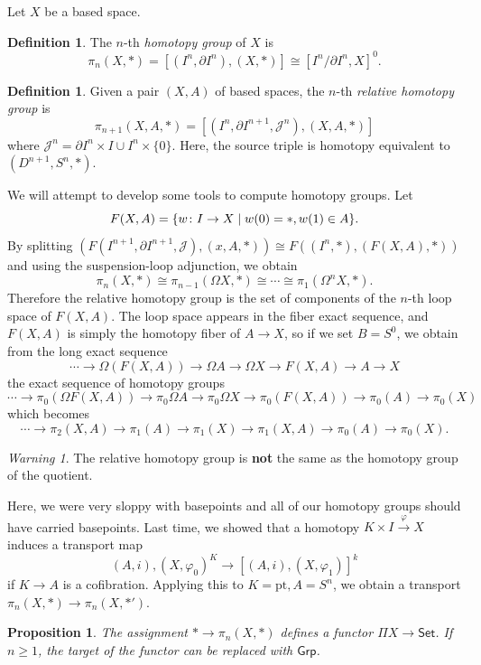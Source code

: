 \documentclass[leqno, openany]{memoir}
\newtheorem{prop}[thm]{Proposition}
\theoremstyle{definition}
\newtheorem{defn}[thm]{Definition}
\theoremstyle{remark}
\newtheorem{warn}[thm]{Warning}
\theoremstyle{plain}
\theoremstyle{definition}
\theoremstyle{remark}
\newcommand{\mc}[1]{\mathcal{#1}}
\newcommand{\mr}[1]{\mathrm{#1}}
\newcommand{\ms}[1]{\mathsf{#1}}
\begin{document}
Let $X$ be a based space.

\begin{defn}
    The $n$-th \textit{homotopy group}  of $X$ is 
    \[ \pi_n(X,*) = [(I^n, \partial I^n), (X,*)] \cong [I^n / \partial I^n, X]^0. \]
\end{defn}

\begin{defn}
    Given a pair $(X,A)$ of based spaces, the $n$-th \textit{relative homotopy group} is
    \[ \pi_{n+1}(X,A,*) = [(I^n, \partial I^{n+1}, \mc{J}^n), (X, A, *)] \]
    where $\mc{J}^n = \partial I^n \times I \cup I^n \times \{0 \}$. Here, the source triple is homotopy equivalent to $(D^{n+1}, S^n, *)$.
\end{defn}

We will attempt to develop some tools to compute homotopy groups. Let
\[ F(X,A) = \qty{w \colon I \to X \mid w(0) = *, w(1) \in A}. \]
By splitting $(F(I^{n+1}, \partial I^{n+1}, \mc{J}), (x, A, *)) \cong F((I^n, *), (F(X,A), *))$ and using the suspension-loop adjunction, we obtain
\[ \pi_n(X, *) \cong \pi_{n-1}(\Omega X, *) \cong \cdots \cong \pi_1(\Omega^n X, *). \]
Therefore the relative homotopy group is the set of components of the $n$-th loop space of $F(X,A)$. The loop space appears in the fiber exact sequence, and $F(X,A)$ is simply the homotopy fiber of $A \to X$, so if we set $B = S^0$, we obtain from the long exact sequence
\[ \cdots \to \Omega(F(X,A)) \to \Omega A \to \Omega X \to F(X,A) \to A \to X \]
the exact sequence of homotopy groups
\[ \cdots \to \pi_0(\Omega F(X,A)) \to \pi_0 \Omega A \to \pi_0 \Omega X \to \pi_0(F(X,A)) \to \pi_0(A) \to \pi_0(X) \]
which becomes
\[ \cdots \to \pi_2(X,A) \to \pi_1(A) \to \pi_1(X) \to \pi_1(X,A) \to \pi_0(A) \to \pi_0(X). \]
\begin{warn}
    The relative homotopy group is \textbf{not} the same as the homotopy group of the quotient. 
\end{warn}

Here, we were very sloppy with basepoints and all of our homotopy groups should have carried basepoints. Last time, we showed that a homotopy $K \times I \xrightarrow{\varphi} X$ induces a transport map
\[ (A, i), (X, \varphi_0)^K \to [(A,i), (X, \varphi_1)]^k \]
if $K \to A$ is a cofibration. Applying this to $K = \mr{pt}, A = S^n$, we obtain a transport $\pi_n(X, *) \to \pi_n(X, *')$.

\begin{prop}
    The assignment $* \to \pi_n(X, *)$ defines a functor $\Pi X \to \ms{Set}$. If $n \geq 1$, the target of the functor can be replaced with $\ms{Grp}$.
\end{prop}
\end{document}
